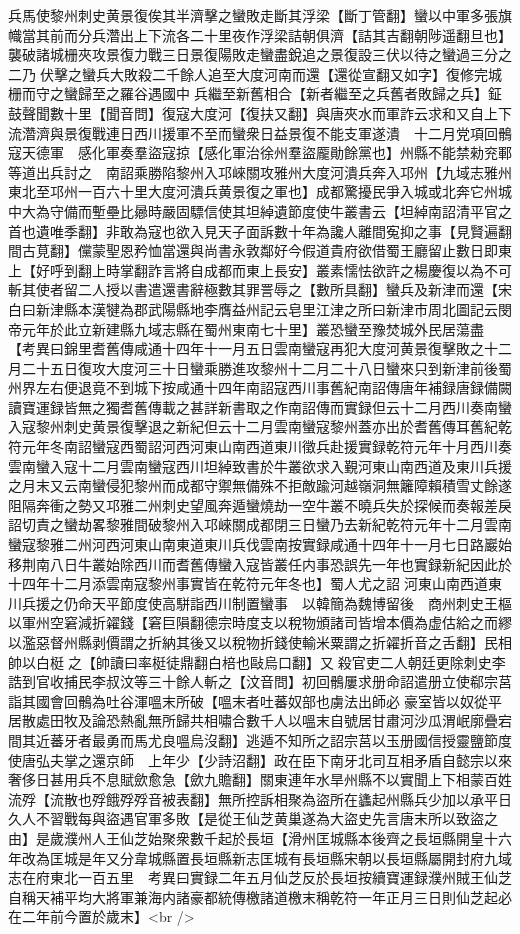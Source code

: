 兵馬使黎州刺史黄景復俟其半濟擊之蠻敗走斷其浮梁【斷丁管翻】蠻以中軍多張旗幟當其前而分兵濳出上下流各二十里夜作浮梁詰朝俱濟【詰其吉翻朝陟遥翻旦也】襲破諸城栅夾攻景復力戰三日景復陽敗走蠻盡銳追之景復設三伏以待之蠻過三分之二乃伏擊之蠻兵大敗殺二千餘人追至大度河南而還【還從宣翻又如字】復修完城栅而守之蠻歸至之羅谷遇國中兵繼至新舊相合【新者繼至之兵舊者敗歸之兵】鉦鼓聲聞數十里【聞音問】復寇大度河【復扶又翻】與唐夾水而軍詐云求和又自上下流濳濟與景復戰連日西川援軍不至而蠻衆日益景復不能支軍遂潰　十二月党項回鶻寇天德軍　感化軍奏羣盜寇掠【感化軍治徐州羣盜龎勛餘黨也】州縣不能禁勑兖鄆等道出兵討之　南詔乘勝陷黎州入邛崍關攻雅州大度河潰兵奔入邛州【九域志雅州東北至邛州一百六十里大度河潰兵黄景復之軍也】成都驚擾民爭入城或北奔它州城中大為守備而塹壘比曏時嚴固驃信使其坦綽遺節度使牛叢書云【坦綽南詔清平官之首也遺唯季翻】非敢為寇也欲入見天子面訴數十年為讒人離間寃抑之事【見賢遍翻間古莧翻】儻蒙聖恩矜恤當還與尚書永敦鄰好今假道貴府欲借蜀王廳留止數日即東上【好呼到翻上時掌翻詐言將自成都而東上長安】叢素懦怯欲許之楊慶復以為不可斬其使者留二人授以書遣還書辭極數其罪詈辱之【數所具翻】蠻兵及新津而還【宋白曰新津縣本漢犍為郡武陽縣地李膺益州記云皂里江津之所曰新津市周北圖記云閔帝元年於此立新建縣九域志縣在蜀州東南七十里】叢恐蠻至豫焚城外民居蕩盡　【考異曰錦里耆舊傳咸通十四年十一月五日雲南蠻寇再犯大度河黄景復擊敗之十二月二十五日復攻大度河三十日蠻乘勝進攻黎州十二月二十八日蠻來只到新津前後蜀州界左右便退竟不到城下按咸通十四年南詔寇西川事舊紀南詔傳唐年補録唐録備闕讀寶運録皆無之獨耆舊傳載之甚詳新書取之作南詔傳而實録但云十二月西川奏南蠻入寇黎州刺史黄景復擊退之新紀但云十二月雲南蠻寇黎州蓋亦出於耆舊傳耳舊紀乾符元年冬南詔蠻寇西蜀詔河西河東山南西道東川徵兵赴援實録乾符元年十月西川奏雲南蠻入寇十二月雲南蠻寇西川坦綽致書於牛叢欲求入覲河東山南西道及東川兵援之月末又云南蠻侵犯黎州而成都守禦無備殊不拒敵踰河越嶺洞無籬障賴積雪丈餘遂阻隔奔衝之勢又邛雅二州刺史望風奔遁蠻燒劫一空牛叢不曉兵失於探候而奏報差戾詔切責之蠻劫畧黎雅間破黎州入邛崍關成都閉三日蠻乃去新紀乾符元年十二月雲南蠻寇黎雅二州河西河東山南東道東川兵伐雲南按實録咸通十四年十一月七日路巖始移荆南八日牛叢始除西川而耆舊傳蠻入寇皆叢任内事恐誤先一年也實録新紀因此於十四年十二月添雲南寇黎州事實皆在乾符元年冬也】蜀人尤之詔河東山南西道東川兵援之仍命天平節度使高駢詣西川制置蠻事　以韓簡為魏博留後　商州刺史王樞以軍州空窘減折糴錢【窘巨隕翻德宗時度支以稅物頒諸司皆增本價為虚估給之而繆以濫惡督州縣剥價謂之折納其後又以稅物折錢使輸米粟謂之折糴折音之舌翻】民相帥以白梃之【帥讀曰率梃徒鼎翻白棓也敺烏口翻】又殺官吏二人朝廷更除刺史李誥到官收捕民李叔汶等三十餘人斬之【汶音問】初回鶻屢求册命詔遣册立使郗宗莒詣其國會回鶻為吐谷渾嗢末所破【嗢末者吐蕃奴部也虜法出師必豪室皆以奴從平居散處田牧及論恐熱亂無所歸共相嘯合數千人以嗢末自號居甘肅河沙瓜渭岷廓疊宕間其近蕃牙者最勇而馬尤良嗢烏沒翻】逃遁不知所之詔宗莒以玉册國信授靈鹽節度使唐弘夫掌之還京師　上年少【少詩沼翻】政在臣下南牙北司互相矛盾自懿宗以來奢侈日甚用兵不息賦歛愈急【歛九贍翻】關東連年水旱州縣不以實聞上下相蒙百姓流殍【流散也殍餓殍殍音被表翻】無所控訴相聚為盜所在蠭起州縣兵少加以承平日久人不習戰每與盜遇官軍多敗【是從王仙芝黄巢遂為大盜史先言唐末所以致盜之由】是歲濮州人王仙芝始聚衆數千起於長垣【滑州匡城縣本後齊之長垣縣開皇十六年改為匡城是年又分韋城縣置長垣縣新志匡城有長垣縣宋朝以長垣縣屬開封府九域志在府東北一百五里　考異曰實録二年五月仙芝反於長垣按續寶運録濮州賊王仙芝自稱天補平均大將軍兼海内諸豪都統傳檄諸道檄末稱乾符一年正月三日則仙芝起必在二年前今置於歲末】<br />
